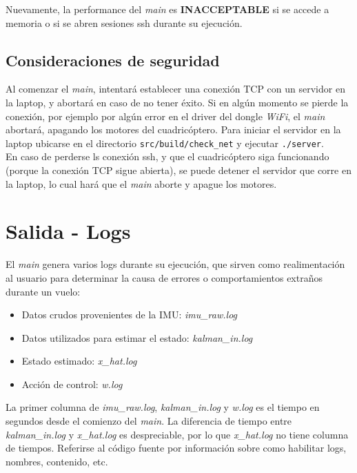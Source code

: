 \documentclass[main]{subfiles}
\begin{document}
Nuevamente, la performance del \textit{main} es \textbf{INACCEPTABLE} si se accede a memoria o si se abren sesiones ssh durante su ejecución.

\subsection{Consideraciones de seguridad}
\label{sec:codigo:consideraciones-de-seguridad}

Al comenzar el \textit{main}, intentará establecer una conexión TCP con un servidor en la laptop, y abortará en caso de no tener éxito. Si en algún momento se pierde la conexión, por ejemplo por algún error en el driver del dongle \textit{WiFi}, el \textit{main} abortará, apagando los motores del cuadricóptero. Para iniciar el servidor en la laptop ubicarse en el directorio \verb+src/build/check_net+ y ejecutar \verb+./server+.\\

En caso de perderse ls conexión ssh, y que el cuadricóptero siga funcionando (porque la conexión TCP sigue abierta), se puede detener el servidor que corre en la laptop, lo cual hará que el \textit{main} aborte y apague los motores.

\section{Salida - Logs}
\label{salidas-logs}

El \textit{main} genera varios logs durante su ejecución, que sirven como realimentación al usuario para determinar la causa de errores o comportamientos extraños durante un vuelo:
\begin{itemize}
\item Datos crudos provenientes de la IMU: \textit{imu\_raw.log}
\item Datos utilizados para estimar el estado: \textit{kalman\_in.log}
\item Estado estimado: \textit{x\_hat.log}
\item Acción de control: \textit{w.log}
\end{itemize}

La primer columna de \textit{imu\_raw.log}, \textit{kalman\_in.log} y \textit{w.log} es el tiempo en segundos desde el comienzo del \textit{main}. La diferencia de tiempo entre \textit{kalman\_in.log} y \textit{x\_hat.log} es despreciable, por lo que \textit{x\_hat.log} no tiene columna de tiempos. Referirse al código fuente por información sobre como habilitar logs, nombres, contenido, etc.\\
\end{document}
